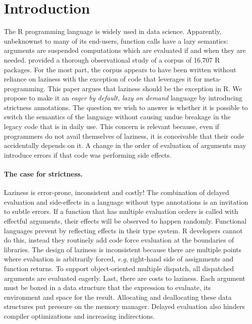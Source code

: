 \documentclass[review,nonacm,screen,acmsmall,anonymous=true]{acmart}
\begin{document}


\maketitle
\section{Introduction}

The R programming language is widely used in data science. Apparently,
unbeknownst to many of its end-users, function calls have a lazy semantics:
arguments are suspended computations which are evaluated if and when they are
needed. \citet{oopsla19b} provided a thorough observational study of a corpus of
16,707 R packages. For the most part, the corpus appears to have been written
without reliance on laziness with the exception of code that leverages it for
meta-programming. This paper argues that laziness should be the exception in R.
We propose to make it an \emph{eager by default, lazy on demand} language by
introducing strictness annotations. The question we wish to answer is whether it
is possible to switch the semantics of the language without causing undue
breakage in the legacy code that is in daily use. This concern is relevant
because, even if programmers do not avail themselves of laziness, it is
conceivable that their code accidentally depends on it. A change in the order of
evaluation of arguments may introduce errors if that code was performing side
effects.

\paragraph{The case for strictness.} Laziness is error-prone, inconsistent
and costly! The combination of delayed evaluation and side-effects in a language
without type annotations is an invitation to subtle errors. If a function that
has multiple evaluation orders is called with effectful arguments, their effects
will be observed to happen randomly. Functional languages prevent by reflecting
effects in their type system. R developers cannot do this, instead they
routinely add code force evaluation at the boundaries of libraries. The design
of laziness is inconsistent because there are multiple points where evaluation
is arbitrarily forced, \emph{e.g}, right-hand side of assignments and function
returns. To support object-oriented multiple dispatch, all dispatched arguments
are evaluated eagerly. Last, there are costs to laziness. Each argument must be
boxed in a data structure that the expression to evaluate, its environment and
space for the result. Allocating and deallocating these data structures put
pressure on the memory manager. Delayed evaluation also hinders compiler
optimizations and increasing indirections.
\end{document}
